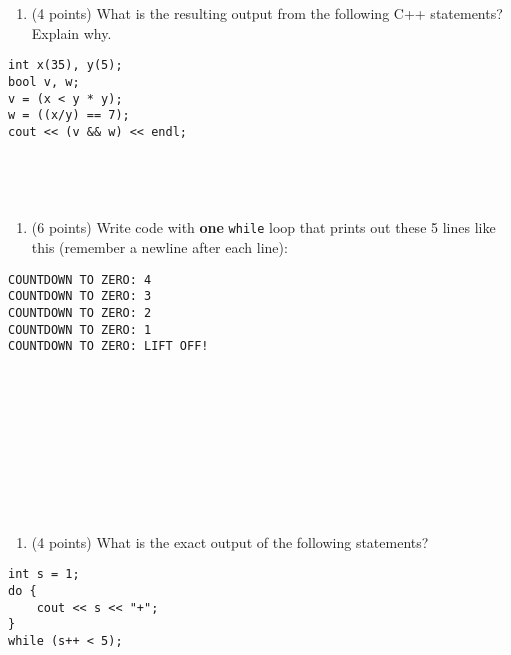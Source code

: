 \pagebreak

\begin{enumerate}
\def\labelenumi{\arabic{enumi}.}
\setcounter{enumi}{4}
\tightlist
\item
  (4 points) What is the resulting output from the following C++
  statements? Explain why.
\end{enumerate}

\begin{verbatim}
int x(35), y(5);
bool v, w;
v = (x < y * y);
w = ((x/y) == 7);
cout << (v && w) << endl;
\end{verbatim}

\begin{verbatim}




\end{verbatim}

\begin{enumerate}
\def\labelenumi{\arabic{enumi}.}
\setcounter{enumi}{5}
\tightlist
\item
  (6 points) Write code with \textbf{one} \texttt{while} loop that
  prints out these 5 lines like this (remember a newline after each
  line):
\end{enumerate}

\begin{verbatim}
COUNTDOWN TO ZERO: 4
COUNTDOWN TO ZERO: 3
COUNTDOWN TO ZERO: 2
COUNTDOWN TO ZERO: 1
COUNTDOWN TO ZERO: LIFT OFF!
\end{verbatim}

\begin{verbatim}










\end{verbatim}

\begin{enumerate}
\def\labelenumi{\arabic{enumi}.}
\setcounter{enumi}{6}
\tightlist
\item
  (4 points) What is the exact output of the following statements?
\end{enumerate}

\begin{verbatim}
int s = 1;
do {
    cout << s << "+";
}
while (s++ < 5);
\end{verbatim}

\begin{verbatim}

\end{verbatim}

